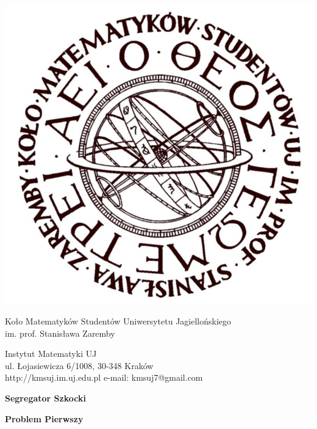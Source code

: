 \documentclass[a4paper,12pt]{memoir}
\begin{document}
\begin{minipage}[c]{.2\linewidth}
	\includegraphics[width=\linewidth]{logo_kms.jpg}
\end{minipage}
\begin{minipage}[c]{.7\linewidth}
	\begin{center}
	Koło Matematyków Studentów Uniwersytetu Jagiellońskiego\\
	im. prof. Stanisława Zaremby

	\scriptsize{
	Instytut Matematyki UJ\\
	ul. Łojasiewicza 6/1008, 30-348 Kraków\\
	http://kmsuj.im.uj.edu.pl   e-mail: kmsuj7@gmail.com
	}
	\end{center}
\end{minipage}

\hrulefill

\begin{vplace}

\begin{center}
	\Huge\textbf{Segregator Szkocki}
\end{center}

\end{vplace}
\begin{vplace}

\begin{center}
	\Large\textbf{Problem Pierwszy}
\end{center}

\end{vplace}
\end{document}
